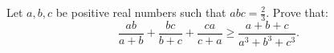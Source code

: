 Let  $a, b, c $  be positive real numbers such that $abc = \frac {2} {3}. $ Prove that:$$\frac {ab}{a + b} + \frac {bc} {b + c} + \frac {ca} {c + a} \geqslant  \frac {a+b+c} {a^3+b ^ 3 + c ^ 3}.$$